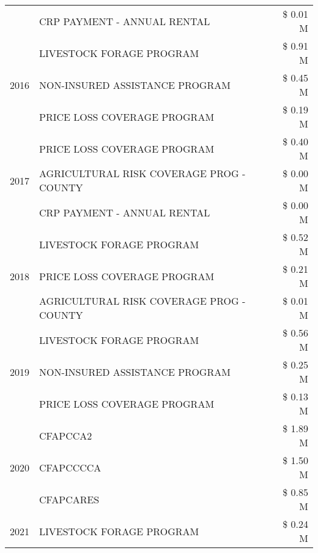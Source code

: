 \begin{tabular}{llr}
 & CRP PAYMENT - ANNUAL RENTAL & \$ 0.01 M \\
\cline{1-3}
\multirow[t]{3}{*}{2016} & LIVESTOCK FORAGE PROGRAM & \$ 0.91 M \\
 & NON-INSURED ASSISTANCE PROGRAM & \$ 0.45 M \\
 & PRICE LOSS COVERAGE PROGRAM & \$ 0.19 M \\
\cline{1-3}
\multirow[t]{3}{*}{2017} & PRICE LOSS COVERAGE PROGRAM & \$ 0.40 M \\
 & AGRICULTURAL RISK COVERAGE PROG - COUNTY & \$ 0.00 M \\
 & CRP PAYMENT - ANNUAL RENTAL & \$ 0.00 M \\
\cline{1-3}
\multirow[t]{3}{*}{2018} & LIVESTOCK FORAGE PROGRAM & \$ 0.52 M \\
 & PRICE LOSS COVERAGE PROGRAM & \$ 0.21 M \\
 & AGRICULTURAL RISK COVERAGE PROG - COUNTY & \$ 0.01 M \\
\cline{1-3}
\multirow[t]{3}{*}{2019} & LIVESTOCK FORAGE PROGRAM & \$ 0.56 M \\
 & NON-INSURED ASSISTANCE PROGRAM & \$ 0.25 M \\
 & PRICE LOSS COVERAGE PROGRAM & \$ 0.13 M \\
\cline{1-3}
\multirow[t]{3}{*}{2020} & CFAPCCA2 & \$ 1.89 M \\
 & CFAPCCCCA & \$ 1.50 M \\
 & CFAPCARES & \$ 0.85 M \\
\cline{1-3}
2021 & LIVESTOCK FORAGE PROGRAM & \$ 0.24 M \\
\cline{1-3}
\bottomrule
\end{tabular}
